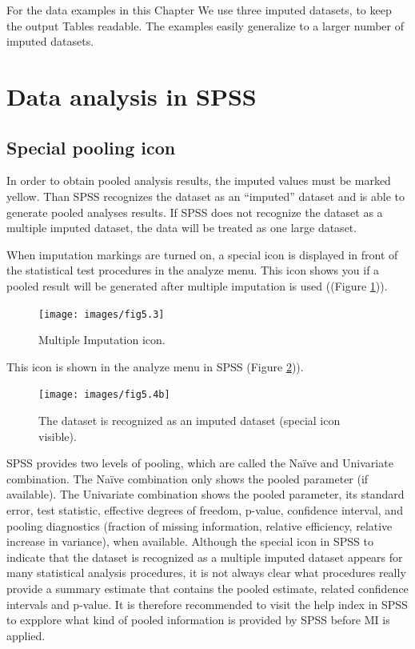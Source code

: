 \documentclass[
]{book}
\begin{document}
For the data examples in this Chapter We use three imputed datasets, to keep the output Tables readable. The examples easily generalize to a larger number of imputed datasets.

\hypertarget{data-analysis-in-spss}{%
\section{Data analysis in SPSS}\label{data-analysis-in-spss}}

\hypertarget{special-pooling-icon}{%
\subsection{Special pooling icon}\label{special-pooling-icon}}

In order to obtain pooled analysis results, the imputed values must be marked yellow. Than SPSS recognizes the dataset as an ``imputed'' dataset and is able to generate pooled analyses results. If SPSS does not recognize the dataset as a multiple imputed dataset, the data will be treated as one large dataset.

When imputation markings are turned on, a special icon is displayed in front of the statistical test procedures in the analyze menu. This icon shows you if a pooled result will be generated after multiple imputation is used ((Figure \ref{fig:fig5-3})).

\begin{figure}

{\centering \texttt{[image: images/fig5.3]} 

}

\caption{Multiple Imputation icon.}\label{fig:fig5-3}
\end{figure}

This icon is shown in the analyze menu in SPSS (Figure \ref{fig:fig5-4b})).

\begin{figure}

{\centering \texttt{[image: images/fig5.4b]} 

}

\caption{The dataset is recognized as an imputed dataset (special icon visible).}\label{fig:fig5-4b}
\end{figure}

SPSS provides two levels of pooling, which are called the Naïve and Univariate combination. The Naïve combination only shows the pooled parameter (if available). The Univariate combination shows the pooled parameter, its standard error, test statistic, effective degrees of freedom, p-value, confidence interval, and pooling diagnostics (fraction of missing information, relative efficiency, relative increase in variance), when available. Although the special icon in SPSS to indicate that the dataset is recognized as a multiple imputed dataset appears for many statistical analysis procedures, it is not always clear what procedures really provide a summary estimate that contains the pooled estimate, related confidence intervals and p-value. It is therefore recommended to visit the help index in SPSS to expplore what kind of pooled information is provided by SPSS before MI is applied.
\end{document}
